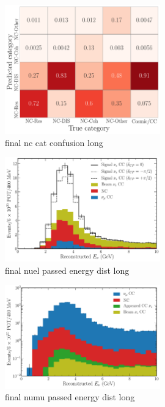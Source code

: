 \begin{figure} %
    \includegraphics[width=0.6\textwidth]{diagrams/7-cvn/chipsnet/final_nc_cat_confusion.pdf}
    \caption[final nc cat confusion short]
    {final nc cat confusion long}
    \label{fig:final_nc_cat_confusion}
\end{figure}

\begin{figure} %
    \includegraphics[width=0.6\textwidth]{diagrams/7-cvn/chipsnet/final_nuel_passed_energy_dist.pdf}
    \caption[final nuel passed energy dist short]
    {final nuel passed energy dist long}
    \label{fig:final_nuel_passed_energy_dist}
\end{figure}

\begin{figure} %
    \includegraphics[width=0.6\textwidth]{diagrams/7-cvn/chipsnet/final_numu_passed_energy_dist.pdf}
    \caption[final numu passed energy dist short]
    {final numu passed energy dist long}
    \label{fig:final_numu_passed_energy_dist}
\end{figure}

